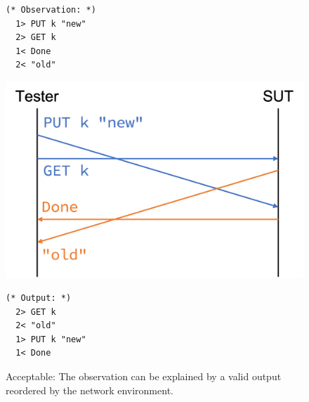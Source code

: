 \begin{figure}
  \centering
  \begin{minipage}[c]{.3\textwidth}
\begin{lstlisting}[style=customcoq]
  (* Observation: *)
  1> PUT k "new"
  2> GET k
  1< Done
  2< "old"
\end{lstlisting}
  \end{minipage}\begin{minipage}[c]{.4\textwidth}
    \includegraphics[width=\linewidth]{figures/network-trace}
  \end{minipage}\begin{minipage}[c]{.3\textwidth}
\begin{lstlisting}[style=customcoq]
  (* Output: *)
  2> GET k
  2< "old"
  1> PUT k "new"
  1< Done
\end{lstlisting}
  \end{minipage}
  \caption[Reordered trace upon network delays.]{Acceptable: The observation can
    be explained by a valid output reordered by the network environment.}
  \label{fig:reordered-trace}
\end{figure}
